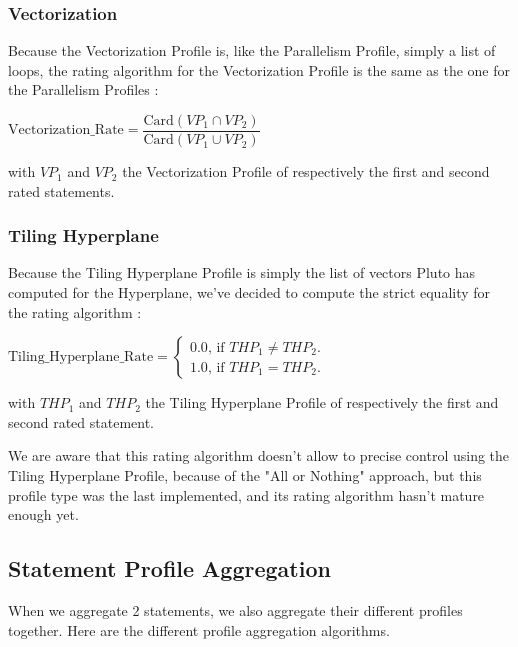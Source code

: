 \documentclass[paper=a4, fontsize=11.5pt]{scrartcl}
\numberwithin{equation}{section}        %
\numberwithin{figure}{section}          %
\numberwithin{table}{section}               %
\begin{document}
        \subsubsection{Vectorization}
            Because the Vectorization Profile is, like the Parallelism Profile, 
            simply a list of loops, the rating algorithm for the Vectorization Profile
            is the same as the one for the Parallelism Profiles :
            \begin{center}
                $ \mathrm{Vectorization\_Rate} =  \dfrac{\mathrm{Card}( {VP_1} \cap {VP_2})}{\mathrm{Card}({VP_1} \cup {VP_2})}$
            \end{center}
            with $VP_1$ and $VP_2$ the Vectorization Profile of respectively the first and second rated statements.
        \subsubsection{Tiling Hyperplane}
            Because the Tiling Hyperplane Profile is simply the list of vectors
            Pluto has computed for the Hyperplane, we've decided to compute the strict
            equality for the rating algorithm : 
            \begin{center}
                $ \mathrm{Tiling\_Hyperplane\_Rate} =  \left \{
                    \begin{array}{c}
                        0.0\text{, if } \mathit{THP}_1 \neq \mathit{THP}_2. \\
                        1.0\text{, if } \mathit{THP}_1 = \mathit{THP}_2.
                    \end{array} \right.$
            \end{center}
            with $\mathit{THP}_1$ and $\mathit{THP}_2$ the Tiling Hyperplane Profile of 
            respectively the first and second rated statement.

            We are aware that this rating algorithm doesn't allow to precise control using the
            Tiling Hyperplane Profile, because of the "All or Nothing" approach,
            but this profile type was the last implemented, and its rating
            algorithm hasn't mature enough yet.

    \subsection{Statement Profile Aggregation}
        When we aggregate 2 statements, we also aggregate their different profiles together.
        Here are the different profile aggregation algorithms.
\end{document}
